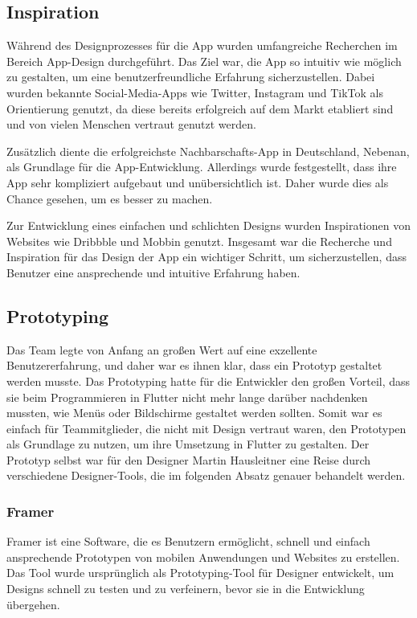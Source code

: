 \subsection{Inspiration}
Während des Designprozesses für die App wurden umfangreiche Recherchen im Bereich App-Design durchgeführt. Das Ziel war, die App so intuitiv wie möglich zu gestalten, um eine benutzerfreundliche Erfahrung sicherzustellen. Dabei wurden bekannte Social-Media-Apps wie Twitter\cite{twitter}, Instagram\cite{instagram} und TikTok\cite{tiktok} als Orientierung genutzt, da diese bereits erfolgreich auf dem Markt etabliert sind und von vielen Menschen vertraut genutzt werden.

Zusätzlich diente die erfolgreichste Nachbarschafts-App in Deutschland, Nebenan\cite{nebenan}, als Grundlage für die App-Entwicklung. Allerdings wurde festgestellt, dass ihre App sehr kompliziert aufgebaut und unübersichtlich ist. Daher wurde dies als Chance gesehen, um es besser zu machen.

Zur Entwicklung eines einfachen und schlichten Designs wurden Inspirationen von Websites wie Dribbble\cite{dribbble} und Mobbin\cite{mobbin} genutzt. Insgesamt war die Recherche und Inspiration für das Design der App ein wichtiger Schritt, um sicherzustellen, dass Benutzer eine ansprechende und intuitive Erfahrung haben.

\subsection{Prototyping}
Das Team legte von Anfang an großen Wert auf eine exzellente
Benutzererfahrung, und daher war es ihnen klar, dass ein
Prototyp gestaltet werden musste. Das Prototyping hatte für
die Entwickler den großen Vorteil, dass sie beim
Programmieren in Flutter nicht mehr lange darüber nachdenken
mussten, wie Menüs oder Bildschirme gestaltet werden
sollten. Somit war es einfach für Teammitglieder, die nicht
mit Design vertraut waren, den Prototypen als Grundlage zu
nutzen, um ihre Umsetzung in Flutter zu gestalten. Der
Prototyp selbst war für den Designer Martin Hausleitner eine
Reise durch verschiedene Designer-Tools, die im folgenden
Absatz genauer behandelt werden.


\subsubsection{Framer}

Framer ist eine Software, die es Benutzern ermöglicht, schnell und einfach ansprechende Prototypen von mobilen Anwendungen und Websites zu erstellen. Das Tool wurde ursprünglich als Prototyping-Tool für Designer entwickelt, um Designs schnell zu testen und zu verfeinern, bevor sie in die Entwicklung übergehen.

